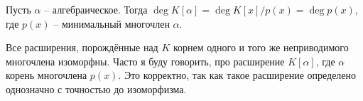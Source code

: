 \crl Пусть $\alpha$ -- алгебраическое. Тогда $\deg K[\alpha]= \deg K[x]/p(x)= \deg p(x)$, где $p(x)$ -- минимальный многочлен $\alpha$.
\ecrl

\crl Все расширения, порождённые над $K$ корнем одного и того же неприводимого многочлена изоморфны. Часто я буду говорить, про расширение $K[\alpha]$, где $\alpha$ корень многочлена $p(x)$. Это корректно, так как такое расширение определено однозначно с точностью до изоморфизма.
\ecrl

